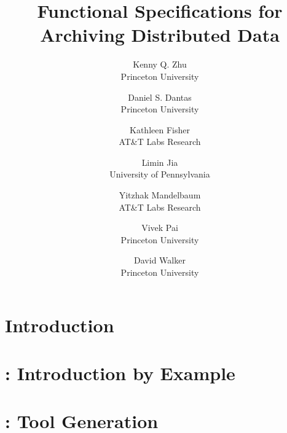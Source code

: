 \documentclass[letterpaper,twocolumn,10pt]{article}
\begin{document}
\title{\Large \bf Functional Specifications for Archiving Distributed Data}

\author{
{\rm Kenny Q. Zhu} \\
Princeton University 
\and
{\rm Daniel S. Dantas}\\
Princeton University 
\and
{\rm Kathleen Fisher} \\
AT\&T Labs Research
\and
{\rm Limin Jia}\\
University of Pennsylvania
\and
{\rm Yitzhak Mandelbaum} \\
AT\&T Labs Research
\and
{\rm Vivek Pai} \\
Princeton University 
\and
{\rm David Walker} \\
Princeton University 
}




\maketitle{}

%

\section {Introduction}
\label{sec:intro}


%

\section{\padsd{}: Introduction by Example}
\label{sec:informal}


\section{\padsd{}: Tool Generation}
\label{sec:programming}

%
\end{document}
